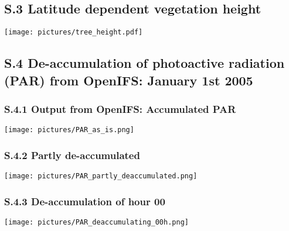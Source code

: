 \documentclass[manuscript]{copernicus}
\begin{document}
\subsection*{S.3 Latitude dependent vegetation height}
\appendixfigures
\begin{center}
  \texttt{[image: pictures/tree\_height.pdf]}
\end{center}

\subsection*{S.4 De-accumulation of photoactive radiation (PAR) from OpenIFS: January 1st 2005}
\subsubsection*{S.4.1 Output from OpenIFS: Accumulated PAR}
\appendixfigures
\begin{center}
  \texttt{[image: pictures/PAR\_as\_is.png]}
\end{center}
\subsubsection*{S.4.2 Partly de-accumulated}
\appendixfigures
\begin{center}
  \texttt{[image: pictures/PAR\_partly\_deaccumulated.png]}
\end{center}
\subsubsection*{S.4.3 De-accumulation of hour 00}
\appendixfigures
\begin{center}
  \texttt{[image: pictures/PAR\_deaccumulating\_00h.png]}
\end{center}
\end{document}
